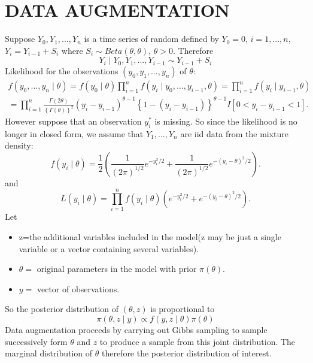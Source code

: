 \documentclass[lecture,12pt,]{pcms-l}
\numberwithin{section}{chapter}
\numberwithin{equation}{chapter}
\theoremstyle{plain}
\theoremstyle{definition}
\theoremstyle{definition}
\begin{document}
\chapter*{DATA AUGMENTATION}
Suppose $Y_0,Y_1,...,Y_n$ is a time series of random defined by $Y_0=0$, $i=1,...,n$, $Y_i=Y_{i-1}+S_i$ where $S_i \sim Beta(\theta,\theta)$, $\theta>0$. Therefore
\begin{equation*}
Y_i\mid Y_0,Y_1,...,Y_{i-1} \sim Y_{i-1}+S_i
\end{equation*}
Likelihood for the observations $(y_0,y_1,...,y_n)$ of $\theta$:
\begin{equation*}
\begin{split}
f(y_0,...,y_n \mid \theta)=f(y_0 \mid \theta)\prod_{i=1}^{n}f(y_i \mid y_0,...,y_{i-1},\theta)=\prod_{i=1}^{n}f(y_i \mid y_{i-1},\theta)
\\
=\prod_{i=1}^{n}\frac{\Gamma(2 \theta)}{\left \{  \Gamma(\theta) \right \}^2}(y_i-y_{i-1})^{\theta-1} \left \{  1- (y_i-y_{i-1}) \right \}^{\theta-1} I \left [ 0<y_i-y_{i-1}<1 \right ].
\end{split}
\end{equation*}
However suppose that an observation $y_{i}^*$ is missing. So since the likelihood is no longer in closed form, we assume that $Y_1,...,Y_n$ are iid data from the mixture density:
\begin{equation*}
f(y_i \mid \theta)=\frac{1}{2}\left ( \frac{1}{(2\pi)^{1/2}}e^{-y_{i}^2/2}+\frac{1}{(2\pi)^{1/2}}e^{-(y_{i}-\theta)^2/2} \right ).
\end{equation*}
and 
\begin{equation*}
L(y_i \mid \theta)=\prod_{i=1}^n f(y_i \mid \theta) \left ( e^{-y_{i}^2/2}+e^{-(y_{i}-\theta)^2/2} \right ).
\end{equation*}
Let
\begin{itemize}
\item z=the additional variables included in the model(z may be just a single variable or a vector containing several variables).
\item $\theta=$ original parameters in the model with prior $\pi(\theta)$.
\item $y=$ vector of observations.
\end{itemize}
So the posterior distribution of $(\theta,z)$ is proportional to 
\begin{equation*}
\pi(\theta,z\mid y) \propto f(y,z \mid \theta)\pi(\theta)
\end{equation*}
Data augmentation proceeds by carrying out Gibbs sampling to sample successively form $\theta$ and $z$ to produce a sample from this joint distribution. The marginal distribution of $\theta$ therefore the posterior distribution of interest. 
\end{document}
